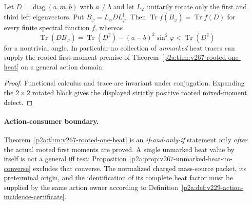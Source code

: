 \documentclass[12pt,a4paper]{article}
\begin{document}
\begin{proposition}
\label{p2a:prop:v267-unmarked-heat-no-converse}
Let $D=\operatorname{diag}(a,m,b)$ with $a\ne b$ and let $L_\varphi$
unitarily rotate only the first and third left eigenvectors.  Put
$B_\varphi=L_\varphi D L_\varphi^\dagger$.  Then
$\operatorname{Tr}f(B_\varphi)=\operatorname{Tr}f(D)$ for every finite
spectral function $f$, whereas
\[
 \operatorname{Tr}(DB_\varphi)
 =\operatorname{Tr}(D^2)-(a-b)^2\sin^2\varphi
 <\operatorname{Tr}(D^2)
\]
for a nontrivial angle.  In particular no collection of \emph{unmarked}
heat traces can supply the rooted first-moment premise of
Theorem~\ref{p2a:thm:v267-rooted-one-heat} on a general action domain.
\end{proposition}
\begin{proof}
Functional calculus and trace are invariant under conjugation.
Expanding the $2\times2$ rotated block gives the displayed strictly
positive rooted mixed-moment defect.
\end{proof}

\paragraph{Action-consumer boundary.}
Theorem~\ref{p2a:thm:v267-rooted-one-heat} is an \emph{if-and-only-if}
statement only \emph{after} the actual rooted first moments are proved.
A single unmarked heat value by itself is not a general iff test;
Proposition~\ref{p2a:prop:v267-unmarked-heat-no-converse}
excludes that converse.  The normalized charged mass-source packet,
its preterminal origin, and the identification of its complete heat
factor must be supplied by the same action owner according to
Definition~\ref{p2a:def:v229-action-incidence-certificate}.
\end{document}
